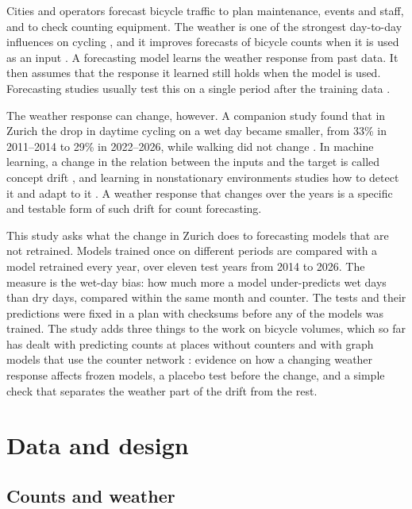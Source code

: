 \documentclass[preprint,12pt,authoryear]{elsarticle}
\begin{document}
Cities and operators forecast bicycle traffic to plan maintenance, events and staff, and to check counting equipment. The weather is one of the strongest day-to-day influences on cycling \citep{nosal2014effect}, and it improves forecasts of bicycle counts when it is used as an input \citep{wessel2020using}. A forecasting model learns the weather response from past data. It then assumes that the response it learned still holds when the model is used. Forecasting studies usually test this on a single period after the training data \citep{tashman2000out}.

The weather response can change, however. A companion study found that in Zurich the drop in daytime cycling on a wet day became smaller, from 33\% in 2011--2014 to 29\% in 2022--2026, while walking did not change \citep{arzimanli2026rain}. In machine learning, a change in the relation between the inputs and the target is called concept drift \citep{gama2014survey}, and learning in nonstationary environments studies how to detect it and adapt to it \citep{alippi2013just,ditzler2015learning}. A weather response that changes over the years is a specific and testable form of such drift for count forecasting.

This study asks what the change in Zurich does to forecasting models that are not retrained. Models trained once on different periods are compared with a model retrained every year, over eleven test years from 2014 to 2026. The measure is the wet-day bias: how much more a model under-predicts wet days than dry days, compared within the same month and counter. The tests and their predictions were fixed in a plan with checksums before any of the models was trained. The study adds three things to the work on bicycle volumes, which so far has dealt with predicting counts at places without counters \citep{kaiser2025counting} and with graph models that use the counter network \citep{wu2019graph,cini2025graph}: evidence on how a changing weather response affects frozen models, a placebo test before the change, and a simple check that separates the weather part of the drift from the rest.

\section{Data and design}

\subsection{Counts and weather}
\end{document}
